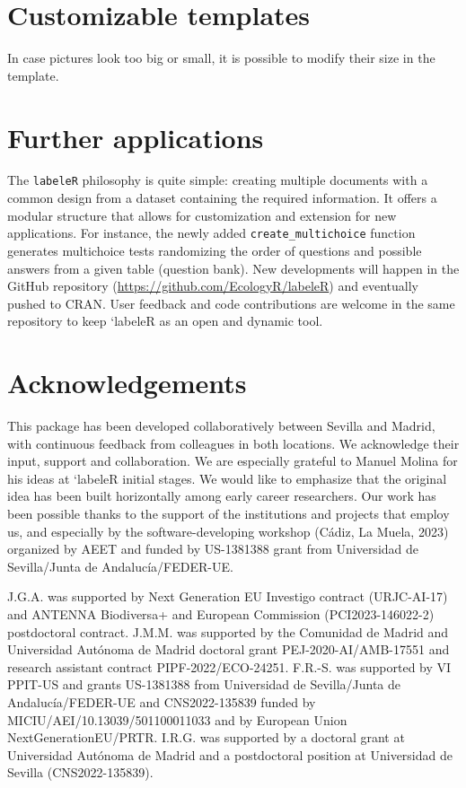 \documentclass[10pt,a4paper,onecolumn]{article}
\begin{document}
\section{Customizable templates}\label{customizable-templates}

In case pictures look too big or small, it is possible to modify their
size in the template.

\section{Further applications}\label{further-applications}

The \texttt{labeleR} philosophy is quite simple: creating multiple
documents with a common design from a dataset containing the required
information. It offers a modular structure that allows for customization
and extension for new applications. For instance, the newly added
\texttt{create\_multichoice} function generates multichoice tests
randomizing the order of questions and possible answers from a given
table (question bank). New developments will happen in the GitHub
repository (\url{https://github.com/EcologyR/labeleR}) and eventually
pushed to CRAN. User feedback and code contributions are welcome in the
same repository to keep `labeleR as an open and dynamic tool.

\section{Acknowledgements}\label{acknowledgements}

This package has been developed collaboratively between Sevilla and
Madrid, with continuous feedback from colleagues in both locations. We
acknowledge their input, support and collaboration. We are especially
grateful to Manuel Molina for his ideas at `labeleR initial stages. We
would like to emphasize that the original idea has been built
horizontally among early career researchers. Our work has been possible
thanks to the support of the institutions and projects that employ us,
and especially by the software-developing workshop (Cádiz, La Muela,
2023) organized by AEET and funded by US-1381388 grant from Universidad
de Sevilla/Junta de Andalucía/FEDER-UE.

J.G.A. was supported by Next Generation EU Investigo contract
(URJC-AI-17) and ANTENNA Biodiversa+ and European Commission
(PCI2023-146022-2) postdoctoral contract. J.M.M. was supported by the
Comunidad de Madrid and Universidad Autónoma de Madrid doctoral grant
PEJ-2020-AI/AMB-17551 and research assistant contract
PIPF-2022/ECO-24251. F.R.-S. was supported by VI PPIT-US and grants
US-1381388 from Universidad de Sevilla/Junta de Andalucía/FEDER-UE and
CNS2022-135839 funded by MICIU/AEI/10.13039/501100011033 and by European
Union NextGenerationEU/PRTR. I.R.G. was supported by a doctoral grant at
Universidad Autónoma de Madrid and a postdoctoral position at
Universidad de Sevilla (CNS2022-135839).
\end{document}
